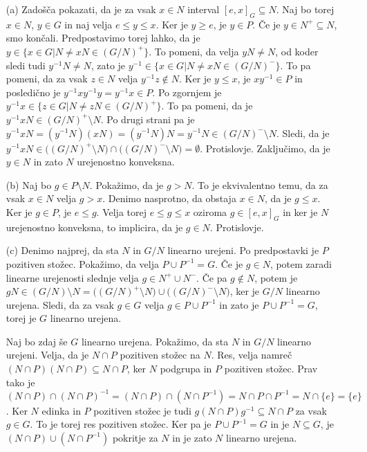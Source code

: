 \documentclass[a4paper, 12pt]{article}
\begin{document}
\begin{enumerate}
\item[(a)]Zadošča pokazati, da je za vsak $x\in N$ interval $[e,x]_G\subseteq N$. Naj bo torej $x\in N$, $y\in G$ in naj velja $e\le y\le x$. Ker je $y\ge e$, je $y\in P$. Če je $y\in N^+ \subseteq N$, smo končali. Predpostavimo torej lahko, da je $y\in \{x\in G| N \neq xN \in (G/N)^+\}$. To pomeni, da velja $yN\neq N$, od koder sledi tudi $y^{-1}N \neq N$, zato je $y^{-1} \in \{ x\in G| N \neq xN \in (G/N)^-\}$. To pa pomeni, da za vsak $z \in N$ velja $y^{-1} z \notin N$. Ker je $y\le x$, je $xy^{-1} \in P$ in posledično je $y^{-1} xy^{-1} y = y^{-1} x \in P$. Po zgornjem je $y^{-1} x \in \{z\in G| N\neq zN \in (G/N)^+\}$. To pa pomeni, da je $y^{-1}xN \in (G/N)^+ \setminus N$. Po drugi strani pa je $y^{-1} x N = (y^{-1}N ) (xN) = (y^{-1} N)N = y^{-1}N \in (G/N)^- \setminus N$. Sledi, da je $y^{-1} xN \in \big((G/N)^+ \setminus N\big) \cap \big( (G/N)^- \setminus N\big)=\emptyset$. Protislovje. Zaključimo, da je $y\in N$ in zato $N$ urejenostno konveksna.

\item[(b)] Naj bo $g\in P\setminus N$. Pokažimo, da je $g> N$. To je ekvivalentno temu, da za vsak $x\in N$ velja $g> x$. Denimo nasprotno, da obstaja $x\in N$, da je $g\le x$. Ker je $g\in P$, je $e \le g$. Velja torej $e \le g \le x$  oziroma $g\in [e,x]_G$  in ker je  $N$ urejenostno konveksna, to implicira, da je $g\in N$. Protislovje.

\item[(c)] Denimo najprej, da sta $N$ in $G/N$ linearno urejeni. Po predpostavki je $P$ pozitiven stožec. Pokažimo, da velja $P\cup P^{-1} = G$. Če je $g\in N$, potem zaradi linearne urejenosti slednje velja $g\in N^+ \cup N^-$. Če pa $g\notin N$, potem je $gN\in (G/N)\setminus N= \big((G/N)^+ \setminus N\big) \cup \big((G/N)^- \setminus N\big)$, ker je $G/N$ linearno urejena. Sledi, da za vsak $g\in G$ velja $g\in P\cup P^{-1}$ in zato je  $P\cup P^{-1} = G$, torej je $G$ linearno urejena.

Naj bo zdaj še $G$ linearno urejena. Pokažimo, da sta $N$ in $G/N$ linearno urejeni. Velja, da je $N\cap P$ pozitiven stožec na $N$. Res, velja namreč $(N\cap P)(N\cap P)\subseteq N\cap P$, ker $N$ podgrupa in $P$ pozitiven stožec. Prav tako je $(N\cap P) \cap (N\cap P)^{-1}  = (N\cap P ) \cap (N\cap P^{-1}) = N \cap P \cap P^{-1} = N\cap \{e\} = \{e\}$. Ker $N$ edinka in $P$ pozitiven stožec je tudi $g(N\cap P) g^{-1} \subseteq N\cap P$ za vsak $g\in G$. To je torej res pozitiven stožec. Ker pa je $P\cup P^{-1} = G$ in je $N\subseteq G$, je $(N\cap P) \cup (N\cap P^{-1})$ pokritje za $N$ in je zato $N$ linearno urejena.


\end{enumerate}
\end{document}
